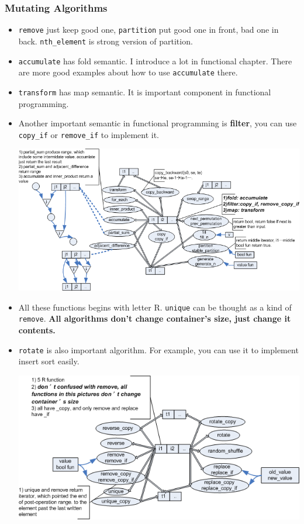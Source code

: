 \documentclass[a4paper,11pt,twoside]{book}
\begin{document}
\subsubsection{Mutating Algorithms}
\begin{itemize}
	\item \texttt{remove} just keep good one, \texttt{partition} put good one in front, bad one in back. \texttt{nth\_element} is strong version of partition.
	
	\item \texttt{accumulate} has fold semantic. I introduce a lot in functional chapter. There are more good examples about how to use \texttt{accumulate} there. 
	
	\item \texttt{transform} has map semantic. It is important component in functional programming.
	
	\item Another important semantic in functional programming is \textbf{filter}, you can use \texttt{copy\_if} or \texttt{remove\_if} to implement it.
	
	\begin{center}
		\includegraphics[width=1.0\linewidth]{pics/stl2.png}
	\end{center}
	
	\item All these functions begins with letter R. \texttt{unique} can be thought as a kind of \texttt{remove}.\textbf{ All algorithms don't change container's size, just change it contents.}
	
	\item \texttt{rotate} is also important algorithm. For example, you can use it to implement insert sort easily. 
	
	\begin{center}
	\includegraphics[width=1.0\linewidth]{pics/std3.png}
	\end{center}
	

\end{itemize}
\end{document}
